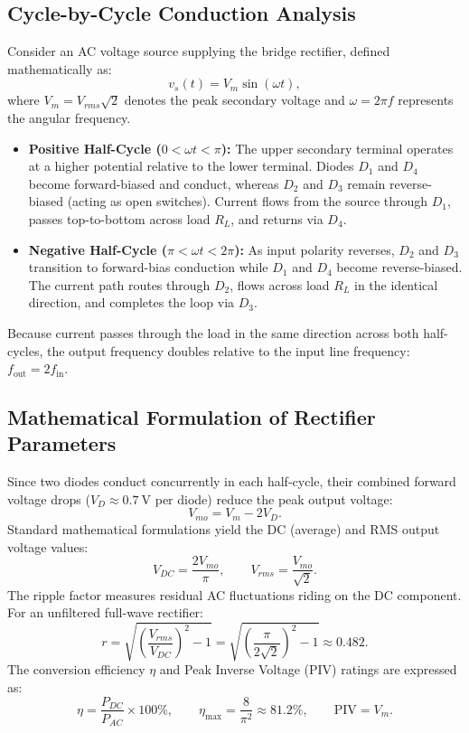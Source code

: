 \subsection{Cycle-by-Cycle Conduction Analysis}
Consider an AC voltage source supplying the bridge rectifier, defined mathematically as:
\[
v_s(t) = V_m \sin(\omega t),
\]
where $V_m = V_{rms}\sqrt{2}$ denotes the peak secondary voltage and $\omega = 2\pi f$ represents the angular frequency.
\begin{itemize}
	\item \textbf{Positive Half-Cycle ($0 < \omega t < \pi$):} The upper secondary terminal operates at a higher potential relative to the lower terminal. Diodes $D_1$ and $D_4$ become forward-biased and conduct, whereas $D_2$ and $D_3$ remain reverse-biased (acting as open switches). Current flows from the source through $D_1$, passes top-to-bottom across load $R_L$, and returns via $D_4$.
	\item \textbf{Negative Half-Cycle ($\pi < \omega t < 2\pi$):} As input polarity reverses, $D_2$ and $D_3$ transition to forward-bias conduction while $D_1$ and $D_4$ become reverse-biased. The current path routes through $D_2$, flows across load $R_L$ in the identical direction, and completes the loop via $D_3$.
\end{itemize}
Because current passes through the load in the same direction across both half-cycles, the output frequency doubles relative to the input line frequency: $f_{\text{out}} = 2 f_{\text{in}}$.

\subsection{Mathematical Formulation of Rectifier Parameters}
Since two diodes conduct concurrently in each half-cycle, their combined forward voltage drops ($V_D \approx \qty{0.7}{\volt}$ per diode) reduce the peak output voltage:
\[
V_{mo} = V_m - 2V_D.
\]
Standard mathematical formulations yield the DC (average) and RMS output voltage values:
\[
V_{DC} = \frac{2V_{mo}}{\pi}, \qquad V_{rms} = \frac{V_{mo}}{\sqrt{2}}.
\]
The ripple factor measures residual AC fluctuations riding on the DC component. For an unfiltered full-wave rectifier:
\[
r = \sqrt{\left(\frac{V_{rms}}{V_{DC}}\right)^2 - 1} = \sqrt{\left(\frac{\pi}{2\sqrt{2}}\right)^2-1} \approx 0.482.
\]
The conversion efficiency $\eta$ and Peak Inverse Voltage (PIV) ratings are expressed as:
\[
\eta = \frac{P_{DC}}{P_{AC}}\times100\%, \qquad \eta_{\max} = \frac{8}{\pi^2}\approx81.2\%, \qquad \text{PIV} = V_m.
\]

